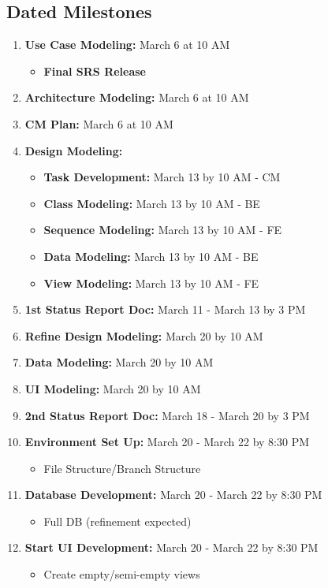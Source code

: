\documentclass[letterpaper,12pt,oneside,listof=totoc]{scrreprt}
\begin{document}
\clearpage

    \subsection{Dated Milestones}
\begin{enumerate}
    \item \textbf{Use Case Modeling:} March 6 at 10 AM
        \begin{itemize}
            \item \textbf{Final SRS Release}
        \end{itemize}
    \item \textbf{Architecture Modeling:} March 6 at 10 AM
    \item \textbf{CM Plan:} March 6 at 10 AM
    
    \item \textbf{Design Modeling:}
        \begin{itemize}
            \item \textbf{Task Development:} March 13 by 10 AM - CM
            \item \textbf{Class Modeling:} March 13 by 10 AM - BE
            \item \textbf{Sequence Modeling:} March 13 by 10 AM - FE
            \item \textbf{Data Modeling:} March 13 by 10 AM - BE
            \item \textbf{View Modeling:} March 13 by 10 AM - FE
        \end{itemize}
    
    \item \textbf{1st Status Report Doc:} March 11 - March 13 by 3 PM
    
    \item \textbf{Refine Design Modeling:} March 20 by 10 AM
    \item \textbf{Data Modeling:} March 20 by 10 AM
    \item \textbf{UI Modeling:} March 20 by 10 AM
    
    \item \textbf{2nd Status Report Doc:} March 18 - March 20 by 3 PM
    
    \item \textbf{Environment Set Up:} March 20 - March 22 by 8:30 PM
        \begin{itemize}
            \item File Structure/Branch Structure
        \end{itemize}
    \item \textbf{Database Development:} March 20 - March 22 by 8:30 PM
        \begin{itemize}
            \item Full DB (refinement expected)
        \end{itemize}
    \item \textbf{Start UI Development:} March 20 - March 22 by 8:30 PM
        \begin{itemize}
            \item Create empty/semi-empty views
        \end{itemize}
    

\end{enumerate}
\end{document}
